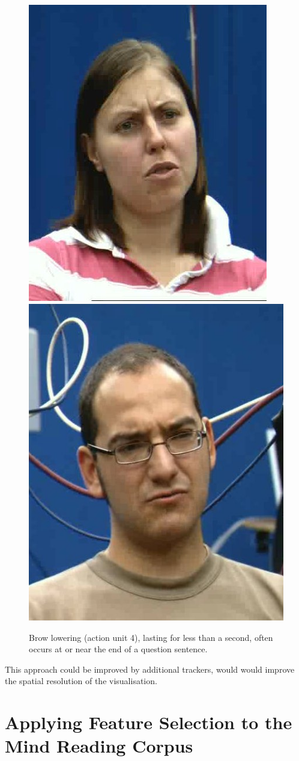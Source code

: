 \begin{figure}[tb]
\includegraphics[width = 0.49 \columnwidth]{featureselection/question-clip_1HTGE8FuGw.jpg}
\includegraphics[width = 0.49 \columnwidth]{featureselection/question-clip_4bg18VX1W3.jpg} \\
\caption{Brow lowering (action unit 4), lasting for less than a second, often occurs at or near the end of a question sentence.}
\label{FigureBrowLoweringQuestion}
\end{figure}

This approach could be improved by additional trackers, would would improve the spatial resolution of the visualisation. %

\section{Applying Feature Selection to the Mind Reading Corpus}
\label{SectionMindReadingFeatureSelection}

